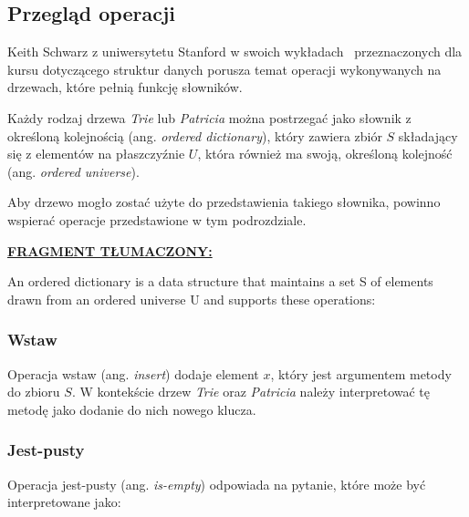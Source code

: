 		\subsection{Przegląd operacji}\label{sec:czescTeoretycznaPrzegladDrzewTrieOperacje}
		
		Keith Schwarz z uniwersytetu Stanford w swoich wykładach~\cite{stanfordKeithSchwarz} przeznaczonych dla kursu dotyczącego struktur danych porusza temat operacji wykonywanych na drzewach, które pełnią funkcję słowników.
		
		Każdy rodzaj drzewa \emph{Trie} lub \emph{Patricia} można postrzegać jako słownik z określoną kolejnością (ang. \emph{ordered dictionary}), który zawiera zbiór $S$ składający się z elementów na płaszczyźnie $U$, która również ma swoją, określoną kolejność (ang. \emph{ordered universe}).
		
        Aby drzewo mogło zostać użyte do przedstawienia takiego słownika, powinno wspierać operacje przedstawione w tym podrozdziale.
        
		\ifsourcematerial
		\begin{displayquote}
			\color{ao(english)}
			\underline{\textbf{FRAGMENT TŁUMACZONY:}} \newline
			
		An ordered dictionary is a data structure that
		maintains a set S of elements drawn from an ordered
		universe U and supports these operations:
		
		\end{displayquote}
		\fi
		
		\subsubsection{Wstaw}\label{sec:czescTeoretycznaPrzegladDrzewTrieOperacjeInsertWstaw}
		
		Operacja wstaw (ang. \emph{insert}) dodaje element $x$, który jest argumentem metody do zbioru $S$. W kontekście drzew \emph{Trie} oraz \emph{Patricia} należy interpretować tę metodę jako dodanie do nich nowego klucza.
		
		\subsubsection{Jest-pusty}\label{sec:czescTeoretycznaPrzegladDrzewTrieOperacjeIsEmptyJestPusty}
		
		Operacja jest-pusty (ang. \emph{is-empty}) odpowiada na pytanie, które może być interpretowane jako:
		
